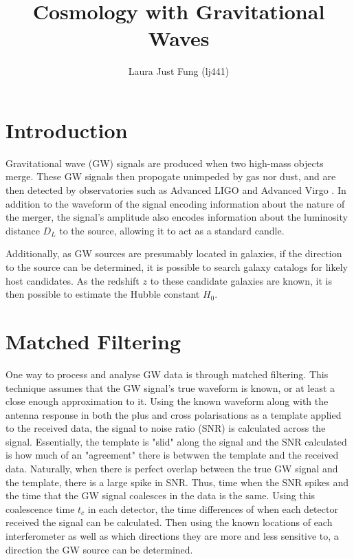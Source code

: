 \documentclass[11pt,a4paper]{article}
\title{Cosmology with Gravitational Waves}
\author{Laura Just Fung (lj441)}
\begin{document}
 

\maketitle
\section{Introduction}
\label{sec:intro}
Gravitational wave (GW) signals are produced when two high-mass objects merge. These GW signals then propogate unimpeded by gas nor dust, and are then detected by observatories such as Advanced LIGO \citep{LIGO2015} and Advanced Virgo \citep{Acernese_2014}. In addition to the waveform of the signal encoding information about the nature of the merger, the signal's amplitude also encodes information about the luminosity distance $D_L$ to the source, allowing it to act as a standard candle. 

Additionally, as GW sources are presumably located in galaxies, if the direction to the source can be determined, it is possible to search galaxy catalogs for likely host candidates. As the redshift $z$ to these candidate galaxies are known, it is then possible to estimate the Hubble constant $H_0$. 

\section{Matched Filtering}
\label{sec:matched_filtering}
One way to process and analyse GW data is through matched filtering. This technique assumes that the GW signal's true waveform is known, or at least a close enough approximation to it. Using the known waveform along with the antenna response in both the plus and cross polarisations as a template applied to the received data, the signal to noise ratio (SNR) is calculated across the signal. Essentially, the template is "slid" along the signal and the SNR calculated is how much of an "agreement" there is betwwen the template and the received data. Naturally, when there is perfect overlap between the true GW signal and the template, there is a large spike in SNR. Thus, time when the SNR spikes and the time that the GW signal coalesces in the data is the same. Using this coalescence time $t_c$ in each detector, the time differences of when each detector received the signal can be calculated. Then using the known locations of each interferometer as well as which directions they are more and less sensitive to, a direction the GW source can be determined. 
\end{document}
